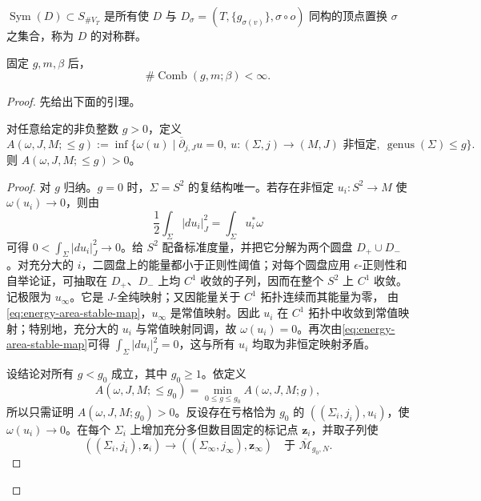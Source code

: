 \begin{definition}\label{def:symmetry-group-intersection-pattern}
$\operatorname{Sym}(D)\subset S_{\#V_T}$ 是所有使 $D$ 与
$D_\sigma=(T,\{g_{\sigma(v)}\},\sigma\circ o)$ 同构的顶点置换 $\sigma$ 之集合，称为 $D$ 的对称群。
\end{definition}

\begin{theorem}\label{thm:finiteness-combinatorial-types-stable-maps}
固定 $g,m,\beta$ 后，
\[
 \#\operatorname{Comb}(g,m;\beta)<\infty.
\]
\end{theorem}

\begin{proof}
先给出下面的引理。
\begin{lemma}\label{lem:positive-energy-fixed-genus}
对任意给定的非负整数 $g>0$，定义
\[
 A(\omega,J,M;\le g):=
 \inf\{\omega(u)\mid \overline\partial_{j,J}u=0,
 \ u:(\Sigma,j)\to(M,J)\text{ 非恒定},
 \ \operatorname{genus}(\Sigma)\le g\}.
\]
则 $A(\omega,J,M;\le g)>0$。
\end{lemma}
\begin{proof}
对 $g$ 归纳。$g=0$ 时，$\Sigma=S^2$ 的复结构唯一。若存在非恒定
$u_i:S^2\to M$ 使 $\omega(u_i)\to0$，则由
\begin{equation}
 \frac12\int_\Sigma|du_i|_J^2=\int_\Sigma u_i^*\omega
 \label{eq:energy-area-stable-map}
\end{equation}
可得 $0<\int_\Sigma|du_i|_J^2\to0$。给 $S^2$ 配备标准度量，并把它分解为两个圆盘
$D_+\cup D_-$。对充分大的 $i$，二圆盘上的能量都小于正则性阈值；对每个圆盘应用
$\epsilon$-正则性和自举论证，可抽取在 $D_+$、$D_-$ 上均
$C^1$ 收敛的子列，因而在整个 $S^2$ 上 $C^1$ 收敛。记极限为
$u_\infty$。它是 $J$-全纯映射；又因能量关于 $C^1$ 拓扑连续而其能量为零，
由\eqref{eq:energy-area-stable-map}，$u_\infty$ 是常值映射。因此 $u_i$ 在
$C^1$ 拓扑中收敛到常值映射；特别地，充分大的 $u_i$ 与常值映射同调，故
$\omega(u_i)=0$。再次由\eqref{eq:energy-area-stable-map}可得
$\int_\Sigma|du_i|_J^2=0$，这与所有 $u_i$ 均取为非恒定映射矛盾。

设结论对所有 $g<g_0$ 成立，其中 $g_0\ge1$。依定义
\[
 A(\omega,J,M;\le g_0)=
 \min_{0\le g\le g_0}A(\omega,J,M;g),
\]
所以只需证明 $A(\omega,J,M;g_0)>0$。反设存在亏格恰为 $g_0$ 的
$((\Sigma_i,j_i),u_i)$，使 $\omega(u_i)\to0$。在每个
$\Sigma_i$ 上增加充分多但数目固定的标记点 $\boldsymbol z_i$，并取子列使
\[
 ((\Sigma_i,j_i),\boldsymbol z_i)\longrightarrow
 ((\Sigma_\infty,j_\infty),\boldsymbol z_\infty)
 \quad\text{于 }\overline{\mathcal M}_{g_0,N}.
\]


\end{proof}
\end{proof}
